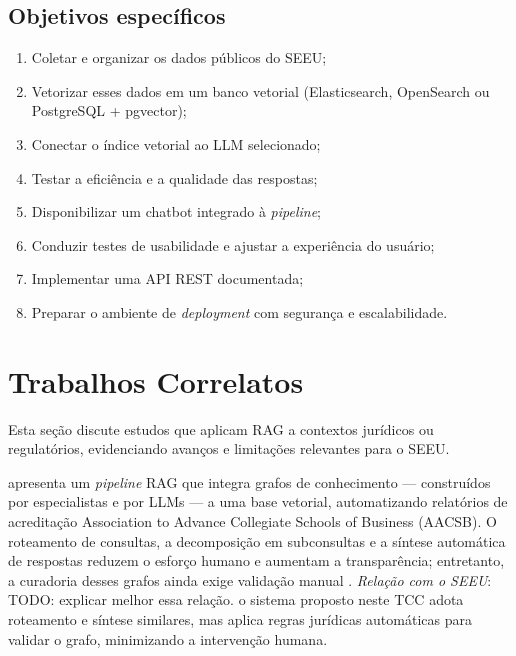 \subsection{Objetivos específicos}
\begin{enumerate}[label=\arabic*.]
  \item Coletar e organizar os dados públicos do SEEU;
  \item Vetorizar esses dados em um banco vetorial (Elasticsearch, OpenSearch
        ou PostgreSQL + pgvector);
  \item Conectar o índice vetorial ao LLM selecionado;
  \item Testar a eficiência e a qualidade das respostas;
  \item Disponibilizar um chatbot integrado à \emph{pipeline};
  \item Conduzir testes de usabilidade e ajustar a experiência do usuário;
  \item Implementar uma API REST documentada;
  \item Preparar o ambiente de \emph{deployment} com segurança e escalabilidade.
\end{enumerate}


\section{Trabalhos Correlatos}
\label{sec:trabalhos-correlatos}

Esta seção discute estudos que aplicam RAG a contextos jurídicos ou regulatórios, evidenciando avanços e limitações relevantes para o SEEU.

 apresenta um \textit{pipeline} RAG que integra grafos de conhecimento — construídos por especialistas e por LLMs — a uma base vetorial, automatizando relatórios de acreditação Association to Advance Collegiate Schools of Business (AACSB). O roteamento de consultas, a decomposição em subconsultas e a síntese automática de respostas reduzem o esforço humano e aumentam a transparência; entretanto, a curadoria desses grafos ainda exige validação manual \cite{edwards2024hybrid}.  
\emph{Relação com o SEEU}: TODO: explicar melhor essa relação. o sistema proposto neste TCC adota roteamento e síntese similares, mas aplica regras jurídicas automáticas para validar o grafo, minimizando a intervenção humana.


